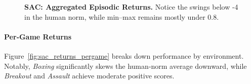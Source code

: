\begin{figure}
	\centering
	\quad
	\caption{\textbf{SAC: Aggregated Episodic Returns.} Notice the swings below -4 in the human norm, while min–max remains mostly under 0.8.}
	\label{fig:sac_returns_human_minmax}
\end{figure}

\paragraph{Per‐Game Returns}
Figure~\ref{fig:sac_returns_pergame} breaks down performance by environment. Notably, \emph{Boxing} significantly skews the human‐norm average downward, while \emph{Breakout} and \emph{Assault} achieve moderate positive scores.

